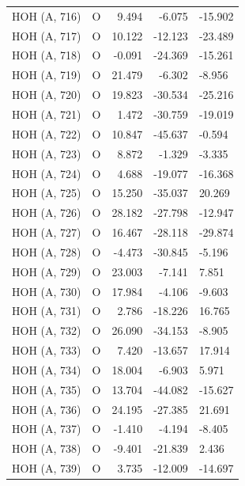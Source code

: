 \begin{longtable}{@{}lcrr@{}}
  \cmidrule(r){1-5}
  HOH (A, 716) & O & 9.494 & -6.075 & -15.902 \\
  \cmidrule(r){1-5}
  HOH (A, 717) & O & 10.122 & -12.123 & -23.489 \\
  \cmidrule(r){1-5}
  HOH (A, 718) & O & -0.091 & -24.369 & -15.261 \\
  \cmidrule(r){1-5}
  HOH (A, 719) & O & 21.479 & -6.302 & -8.956 \\
  \cmidrule(r){1-5}
  HOH (A, 720) & O & 19.823 & -30.534 & -25.216 \\
  \cmidrule(r){1-5}
  HOH (A, 721) & O & 1.472 & -30.759 & -19.019 \\
  \cmidrule(r){1-5}
  HOH (A, 722) & O & 10.847 & -45.637 & -0.594 \\
  \cmidrule(r){1-5}
  HOH (A, 723) & O & 8.872 & -1.329 & -3.335 \\
  \cmidrule(r){1-5}
  HOH (A, 724) & O & 4.688 & -19.077 & -16.368 \\
  \cmidrule(r){1-5}
  HOH (A, 725) & O & 15.250 & -35.037 & 20.269 \\
  \cmidrule(r){1-5}
  HOH (A, 726) & O & 28.182 & -27.798 & -12.947 \\
  \cmidrule(r){1-5}
  HOH (A, 727) & O & 16.467 & -28.118 & -29.874 \\
  \cmidrule(r){1-5}
  HOH (A, 728) & O & -4.473 & -30.845 & -5.196 \\
  \cmidrule(r){1-5}
  HOH (A, 729) & O & 23.003 & -7.141 & 7.851 \\
  \cmidrule(r){1-5}
  HOH (A, 730) & O & 17.984 & -4.106 & -9.603 \\
  \cmidrule(r){1-5}
  HOH (A, 731) & O & 2.786 & -18.226 & 16.765 \\
  \cmidrule(r){1-5}
  HOH (A, 732) & O & 26.090 & -34.153 & -8.905 \\
  \cmidrule(r){1-5}
  HOH (A, 733) & O & 7.420 & -13.657 & 17.914 \\
  \cmidrule(r){1-5}
  HOH (A, 734) & O & 18.004 & -6.903 & 5.971 \\
  \cmidrule(r){1-5}
  HOH (A, 735) & O & 13.704 & -44.082 & -15.627 \\
  \cmidrule(r){1-5}
  HOH (A, 736) & O & 24.195 & -27.385 & 21.691 \\
  \cmidrule(r){1-5}
  HOH (A, 737) & O & -1.410 & -4.194 & -8.405 \\
  \cmidrule(r){1-5}
  HOH (A, 738) & O & -9.401 & -21.839 & 2.436 \\
  \cmidrule(r){1-5}
  HOH (A, 739) & O & 3.735 & -12.009 & -14.697 \\

\end{longtable}
